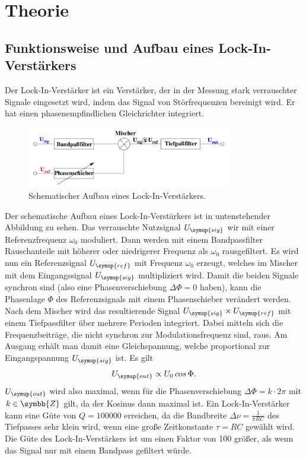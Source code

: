 \section{Theorie}
\label{sec:Theorie}
 \subsection{Funktionsweise und Aufbau eines Lock-In-Verstärkers}
  Der Lock-In-Verstärker ist ein Verstärker, der in der Messung stark verrauschter
  Signale eingesetzt wird, indem das Signal von Störfrequenzen bereinigt wird.
  Er hat einen phasenempfindlichen Gleichrichter integriert.
  \begin{figure}
    \centering
    \includegraphics[width=0.8\textwidth]{aufbau.png}
    \caption{Schematischer Aufbau eines Lock-In-Verstärkers.}
    \label{fig:aufbau}
  \end{figure}
  Der schematische Aufbau eines Lock-In-Verstärkers ist in untenstehender Abbildung
  zu sehen.
  Das verrauschte Nutzsignal $U_\symup{sig}$ wir mit einer Referenzfrequenz $\omega_0$
  moduliert. Dann werden mit einem Bandpassfilter Rauschanteile mit höherer oder
  niedrigerer Frequenz als $\omega_0$ rausgefiltert.
  Es wird nun ein Referenzsignal $U_\symup{ref}$ mit Frequenz $\omega_0$ erzeugt,
  welches im Mischer mit dem Eingangssignal $U_\symup{sig}$ multipliziert wird.
  Damit die beiden Signale synchron sind (also eine Phasenverschiebung
  $\Delta\Phi=0$ haben), kann die Phasenlage $\Phi$ des Referenzsignals mit einem
  Phasenschieber verändert werden.
  Nach dem Mischer wird das resultierende Signal $U_\symup{sig} \times U_\symup{ref}$
  mit einem Tiefpassfilter über mehrere Perioden integriert. Dabei mitteln sich
  die Frequenzbeiträge, die nicht synchron zur Modulationsfrequenz sind, raus.
  Am Ausgang erhält man damit eine Gleichspannung, welche proportional zur
  Eingangspannung $U_\symup{sig}$ ist. Es gilt
  \begin{equation}
    U_\symup{out}\propto U_0\, cos\,\Phi.
    \label{eqn:porportionalitaet}
  \end{equation}
  $U_\symup{out}$ wird also maximal, wenn für die Phasenverschiebung
  $\Delta\Phi=k\cdot2\pi$ mit $k\in\symbb{Z}$ gilt, da der Kosinus dann maximal ist.
  Ein Lock-In-Verstärker kann eine Güte von $Q=100000$ erreichen, da die Bandbreite
  $\Delta\nu = \frac{1}{\pi RC}$ des Tiefpasses sehr klein wird, wenn eine große
  Zeitkonstante $\tau=RC$ gewählt wird.
  Die Güte des Lock-In-Verstärkers ist um einen Faktor von 100 größer, als wenn
  das Signal nur mit einem Bandpass gefiltert würde.
  \newpage
